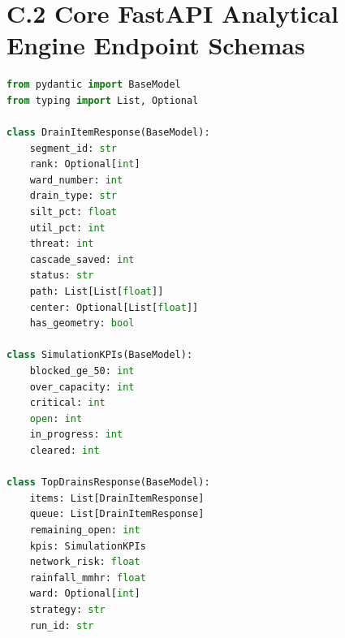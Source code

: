 \documentclass[12pt,a4paper]{report}
\begin{document}
\section*{C.2 Core FastAPI Analytical Engine Endpoint Schemas}
\begin{lstlisting}[language=Python]
from pydantic import BaseModel
from typing import List, Optional

class DrainItemResponse(BaseModel):
    segment_id: str
    rank: Optional[int]
    ward_number: int
    drain_type: str
    silt_pct: float
    util_pct: int
    threat: int
    cascade_saved: int
    status: str
    path: List[List[float]]
    center: Optional[List[float]]
    has_geometry: bool

class SimulationKPIs(BaseModel):
    blocked_ge_50: int
    over_capacity: int
    critical: int
    open: int
    in_progress: int
    cleared: int

class TopDrainsResponse(BaseModel):
    items: List[DrainItemResponse]
    queue: List[DrainItemResponse]
    remaining_open: int
    kpis: SimulationKPIs
    network_risk: float
    rainfall_mmhr: float
    ward: Optional[int]
    strategy: str
    run_id: str
\end{lstlisting}

\end{document}
